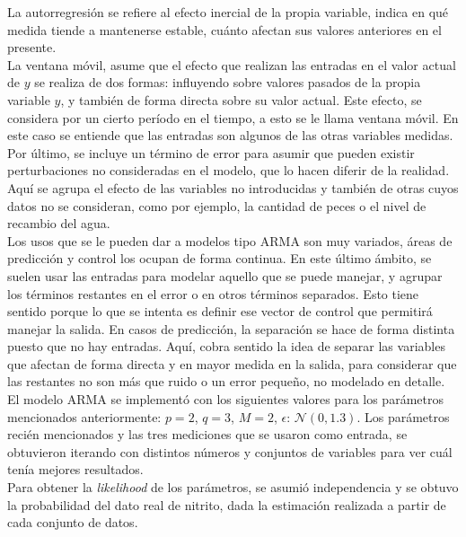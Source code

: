 \documentclass[letterpaper, 12pt]{article}
\begin{document}
La autorregresión se refiere al efecto inercial de la propia variable, indica en qué medida tiende a mantenerse estable, cuánto afectan sus valores anteriores en el presente.\\

La ventana móvil, asume que el efecto que realizan las entradas en el valor actual de $y$ se realiza de dos formas: influyendo sobre valores pasados de la propia variable $y$, y también de forma directa sobre su valor actual. Este efecto, se considera por un cierto período en el tiempo, a esto se le llama ventana móvil. En este caso se entiende que las entradas son algunos de las otras variables medidas.\\

Por último, se incluye un término de error para asumir que pueden existir perturbaciones no consideradas en el modelo, que lo hacen diferir de la realidad. Aquí se agrupa el efecto de las variables no introducidas y también de otras cuyos datos no se consideran, como por ejemplo, la cantidad de peces o el nivel de recambio del agua.\\

Los usos que se le pueden dar a modelos tipo ARMA son muy variados, áreas de predicción y control los ocupan de forma continua. En este último ámbito, se suelen usar las entradas para modelar aquello que se puede manejar, y agrupar los términos restantes en el error o en otros términos separados. Esto tiene sentido porque lo que se intenta es definir ese vector de control que permitirá manejar la salida. En casos de predicción, la separación se hace de forma distinta puesto que no hay entradas. Aquí, cobra sentido la idea de separar las variables que afectan de forma directa y en mayor medida en la salida, para considerar que las restantes no son más que ruido o un error pequeño, no modelado en detalle.\\

El modelo ARMA se implementó con los siguientes valores para los parámetros mencionados anteriormente: $p = 2$, $q = 3$, $M = 2$, $\epsilon$: $\mathcal{N}(0, 1.3)$. Los parámetros recién mencionados y las tres mediciones que se usaron como entrada, se obtuvieron iterando con distintos números y conjuntos de variables para ver cuál tenía mejores resultados. \\

Para obtener la \textit{likelihood} de los parámetros, se asumió independencia y se obtuvo la probabilidad del dato real de nitrito, dada la estimación realizada a partir de cada conjunto de datos.
\end{document}

